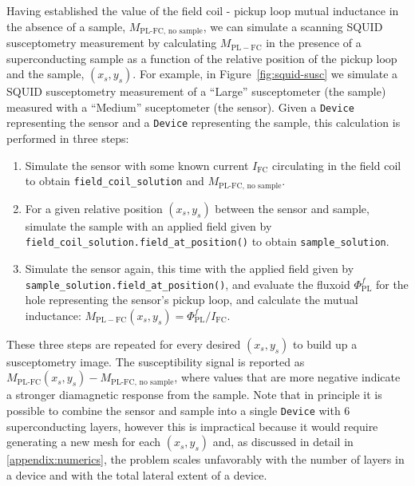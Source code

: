 \documentclass[final,3p,times,twocolumn]{elsarticle}
\newcommand{\inline}[1]{\texttt{#1}\xspace}
\begin{document}
Having established the value of the field coil - pickup loop mutual inductance in the absence of a sample, $M_\text{PL-FC, no sample}$, we can simulate a scanning SQUID susceptometry measurement by calculating $M_\mathrm{PL-FC}$ in the presence of a superconducting sample as a function of the relative position of the pickup loop and the sample, $(x_s, y_s)$. For example, in Figure~\ref{fig:squid-susc} we simulate a SQUID susceptometry measurement of a ``Large'' susceptometer (the sample) measured with a ``Medium'' suceptometer (the sensor). Given a \inline{Device} representing the sensor and a \inline{Device} representing the sample, this calculation is performed in three steps:
\begin{enumerate}
    \item{Simulate the sensor with some known current $I_\mathrm{FC}$ circulating in the field coil to obtain \inline{field_coil_solution} and $M_\text{PL-FC, no sample}$.}
    \item{For a given relative position $(x_s, y_s)$ between the sensor and sample, simulate the sample with an applied field given by \inline{field_coil_solution.field_at_position()} to obtain \inline{sample_solution}.}
    \item{Simulate the sensor again, this time with the applied field given by \inline{sample_solution.field_at_position()}, and evaluate the fluxoid $\Phi^f_\mathrm{PL}$ for the hole representing the sensor's pickup loop, and calculate the mutual inductance: $M_\mathrm{PL-FC}(x_s, y_s)=\Phi^f_\mathrm{PL} / I_\mathrm{FC}$.}
\end{enumerate}
These three steps are repeated for every desired $(x_s, y_s)$ to build up a susceptometry image. The susceptibility signal is reported as $M_\text{PL-FC}(x_s, y_s) - M_\text{PL-FC, no sample}$, where values that are more negative indicate a stronger diamagnetic response from the sample. Note that in principle it is possible to combine the sensor and sample into a single \inline{Device} with 6 superconducting layers, however this is impractical because it would require generating a new mesh for each $(x_s, y_s)$ and, as discussed in detail in \ref{appendix:numerics}, the problem scales unfavorably with the number of layers in a device and with the total lateral extent of a device.

\end{document}

